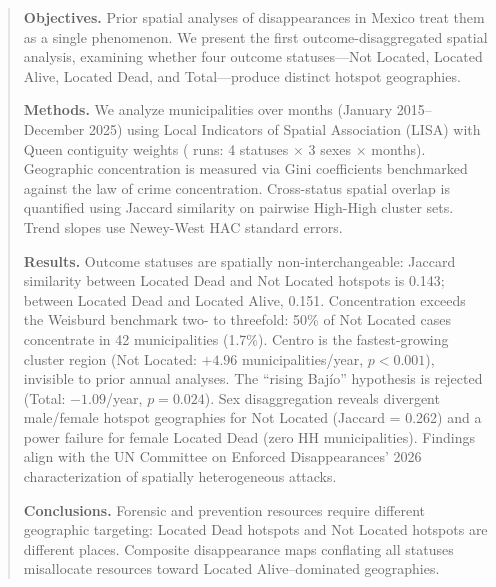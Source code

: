 \begin{abstract}
\noindent\textbf{Objectives.}
Prior spatial analyses of disappearances in Mexico treat them as a single phenomenon.
We present the first outcome-disaggregated spatial analysis, examining whether four outcome statuses---Not Located, Located Alive, Located Dead, and Total---produce distinct hotspot geographies.

\noindent\textbf{Methods.}
We analyze \nmunis{} municipalities over \nmonths{} months (January 2015--December 2025) using Local Indicators of Spatial Association (LISA) with Queen contiguity weights (\nLISAruns{} runs: 4 statuses $\times$ 3 sexes $\times$ \nmonths{} months).
Geographic concentration is measured via Gini coefficients benchmarked against the law of crime concentration.
Cross-status spatial overlap is quantified using Jaccard similarity on pairwise High-High cluster sets.
Trend slopes use Newey-West HAC standard errors.

\noindent\textbf{Results.}
Outcome statuses are spatially non-interchangeable: Jaccard similarity between Located Dead and Not Located hotspots is 0.143; between Located Dead and Located Alive, 0.151.
Concentration exceeds the Weisburd benchmark two- to threefold: 50\% of Not Located cases concentrate in 42 municipalities (1.7\%).
Centro is the fastest-growing cluster region (Not Located: $+4.96$ municipalities/year, $p < 0.001$), invisible to prior annual analyses.
The ``rising Baj\'{i}o'' hypothesis is rejected (Total: $-1.09$/year, $p = 0.024$).
Sex disaggregation reveals divergent male/female hotspot geographies for Not Located (Jaccard = 0.262) and a power failure for female Located Dead (zero HH municipalities).
Findings align with the UN Committee on Enforced Disappearances' 2026 characterization of spatially heterogeneous attacks.

\noindent\textbf{Conclusions.}
Forensic and prevention resources require different geographic targeting: Located Dead hotspots and Not Located hotspots are different places.
Composite disappearance maps conflating all statuses misallocate resources toward Located Alive--dominated geographies.
\end{abstract}
